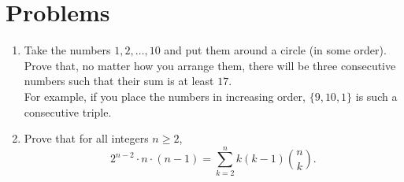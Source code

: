 \documentclass[11pt]{article}
\begin{document}
\section{Problems}


\begin{enumerate}

\item Take the numbers $1,2, \ldots, 10$ and put them around a circle (in some order).  Prove that, no matter how you arrange them, there will be three consecutive numbers such that their sum is at least $17$.  \\
For example, if you place the numbers in increasing order, $\{9,10,1\}$ is such a consecutive triple.










\item Prove that for all integers $n\ge 2$,
\[
2^{n-2} \cdot n \cdot (n-1) = \sum_{k=2}^n k (k-1) \binom{n}{k}.
\]



\end{enumerate}
\end{document}

